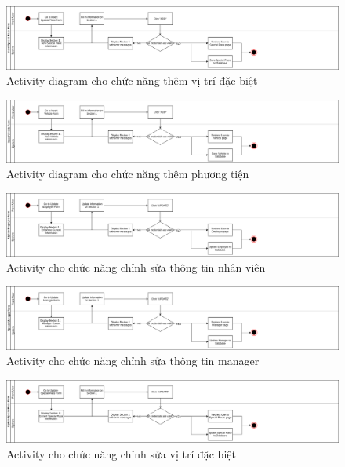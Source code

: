 \documentclass{article}
\begin{document}
\begin{figure}[H]
\centering
\includegraphics[scale=0.4]{themvitridacbiet}
\caption{Activity diagram cho chức năng thêm vị trí đặc biệt}
\end{figure}

\begin{figure}[H]
\centering
\includegraphics[scale=0.4]{themphuongtien}
\caption{Activity diagram cho chức năng thêm phương tiện}
\end{figure}

\begin{figure}[H]
\centering
\includegraphics[scale=0.4]{chinhsuanhanvien}
\caption{Activity cho chức năng chỉnh sửa thông tin nhân viên}
\end{figure}

\begin{figure}[H]
\centering
\includegraphics[scale=0.4]{chinhsuaquanli}
\caption{Activity cho chức năng chỉnh sửa thông tin manager}
\end{figure}

\begin{figure}[H]
\centering
\includegraphics[scale=0.4]{chinhsuavitridacbiet}
\caption{Activity cho chức năng chỉnh sửa vị trí đặc biệt}
\end{figure}
\end{document}
